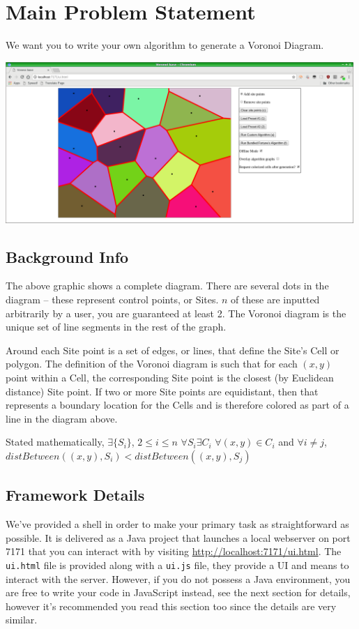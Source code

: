 \documentclass[12pt]{article}
\newcommand{\nl}{\newline}
\begin{document}
\section*{Main Problem Statement}

We want you to write your own algorithm to generate a Voronoi Diagram. \nl

\includegraphics[width=0.99\textwidth]{screenshot.png}

\subsection*{Background Info}

The above graphic shows a complete diagram. There are several dots in the
diagram -- these represent control points, or Sites. $n$ of these are inputted
arbitrarily by a user, you are guaranteed at least 2. The Voronoi diagram is
the unique set of line segments in the rest of the graph.

Around each Site point is a set of edges, or lines, that define the Site's
Cell or polygon. The definition of the Voronoi diagram is such that for each
$(x, y)$ point within a Cell, the corresponding Site point is the closest (by
Euclidean distance) Site point. If two or more Site points are equidistant,
then that represents a boundary location for the Cells and is therefore
colored as part of a line in the diagram above.

Stated mathematically,\nl\nl
$\exists \{S_i\}$, $2 \leq i \leq n$ \nl
$\forall S_i \exists C_i$ \nl
$\forall (x,y) \in C_i$ and $\forall i \neq j$, $distBetween((x,y), S_i) < distBetween((x,y), S_j)$

\subsection*{Framework Details}

We've provided a shell in order to make your primary task as straightforward as
possible. It is delivered as a Java project that launches a local webserver on
port 7171 that you can interact with by visiting
\url{http://localhost:7171/ui.html}. The \texttt{ui.html} file is provided along with a
\texttt{ui.js} file, they provide a UI and means to interact with the server.
However, if you do not possess a Java environment, you
are free to write your code in JavaScript instead, see the next section for
details, however it's recommended you read this section too since the details
are very similar.
\end{document}
